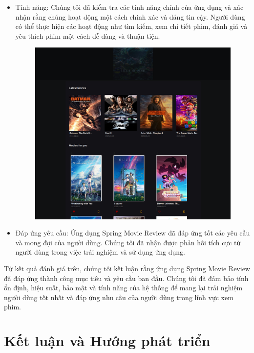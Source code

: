 \documentclass[12pt]{article}
\begin{document}
\begin{itemize}
    \item Tính năng: Chúng tôi đã kiểm tra các tính năng chính của ứng dụng và xác nhận rằng chúng hoạt động một cách chính xác và đáng tin cậy. Người dùng có thể thực hiện các hoạt động như tìm kiếm, xem chi tiết phim, đánh giá và yêu thích phim một cách dễ dàng và thuận tiện.
    \begin{figure}[H]
        \centering
        \includegraphics*[scale=0.3]{Figs/Evaluate.png}
    \end{figure}
    \item Đáp ứng yêu cầu: Ứng dụng Spring Movie Review đã đáp ứng tốt các yêu cầu và mong đợi của người dùng. Chúng tôi đã nhận được phản hồi tích cực từ người dùng trong việc trải nghiệm và sử dụng ứng dụng.
\end{itemize}
Từ kết quả đánh giá trên, chúng tôi kết luận rằng ứng dụng Spring Movie Review đã đáp ứng thành công mục tiêu và yêu cầu ban đầu. Chúng tôi đã đảm bảo tính ổn định, hiệu suất, bảo mật và tính năng của hệ thống để mang lại trải nghiệm người dùng tốt nhất và đáp ứng nhu cầu của người dùng trong lĩnh vực xem phim.
\section{Kết luận và Hướng phát triển}
\end{document}
